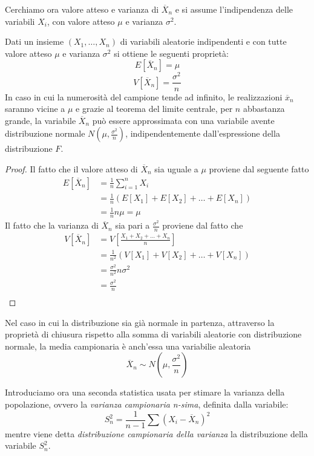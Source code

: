 \documentclass[a4paper,12pt, oneside]{book}
\begin{document}
Cerchiamo ora valore atteso e varianza di $\overline{X}_n$ e si assume l'indipendenza delle variabili $X_i$,
con valore atteso $\mu$ e varianza $\sigma ^ 2$.
\begin{teo}
    Dati un insieme $(X_1, \dots, X_n)$ di variabili aleatorie indipendenti e con tutte valore atteso $\mu$ 
    e varianza $\sigma ^ 2$ si ottiene le seguenti proprietà:
    \[ E[\overline{X}_n] = \mu \]
    \[ V[\overline{X}_n] = \frac{\sigma ^ 2}{n} \]
    In caso in cui la numerosità del campione tende ad infinito, le realizzazioni $\overline{x}_n$ saranno vicine 
    a $\mu$ e grazie al teorema del limite centrale, per $n$ abbastanza grande, la variabile $\overline{X}_n$ può
    essere approssimata con una variabile avente distribuzione normale $N(\mu, \frac{\sigma ^ 2}{n})$, indipendentemente
    dall'espressione della distribuzione $F$.
\end{teo}
\begin{proof}
    Il fatto che il valore atteso di $\overline{X}_n$ sia uguale a $\mu$ proviene dal seguente fatto
    \[ \begin{split}
        E[\overline{X}_n] & = \frac{1}{n} \sum _{i = 1}^n X_i \\
                          & = \frac{1}{n} (E[X_1] + E[X_2] + \dots + E[X_n])\\
                          & = \frac{1}{n} n\mu = \mu
        \end{split} \]
    Il fatto che la varianza di $\overline{X}_n$ sia pari a $\frac{\sigma^2}{n}$ proviene dal fatto che 
    \[ \begin{split}
        V[\overline{X}_n] & = V[\frac{X_1 + X_2 + \dots + X_n}{n}] \\
                          & = \frac{1}{n^2} (V[X_1] + V[X_2] + \dots + V[X_n])\\
                          & = \frac{\sigma^2}{n^2} n\sigma^2 \\
                          & = \frac{\sigma^2}{n}\\
        \end{split} \]
\end{proof}
Nel caso in cui la distribuzione sia già normale in partenza, attraverso la proprietà di chiusura rispetto alla somma di
variabili aleatorie con distribuzione normale, la media campionaria è anch'essa una variabilie aleatoria
\[ \overline{X}_n \sim N(\mu, \frac{\sigma ^ 2}{n}) \]

Introduciamo ora una seconda statistica usata per stimare la varianza della popolazione,
ovvero la \emph{varianza campionaria n-sima}, definita dalla variabile:
\[ S_n ^ 2 = \frac{1}{n - 1} \sum(X_i - \overline{X}_n) ^2 \]
mentre viene detta \emph{distribuzione campionaria della varianza} la distribuzione della variabile $S_n^2$.
\end{document}
